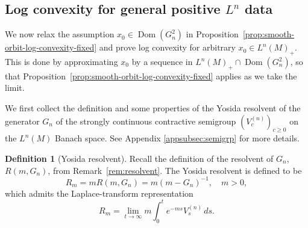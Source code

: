 \documentclass[11pt,a4paper]{article}
\theoremstyle{plain}
\numberwithin{theorem}{section}
\theoremstyle{definition}
\newtheorem{definition}[theorem]{Definition}
\newcommand{\?}{\overset{?}{=}}
\newcommand{\I}{\infty}
\DeclareMathOperator{\Dom}{Dom}
\begin{document}
\subsection{Log convexity for general positive \texorpdfstring{$L^n$}{Ln} data}
\label{subsec:integer-renyi-qnec-final-fixed}

We now relax the assumption $x_0\in \Dom(G_n^2)$ in Proposition~\ref{prop:smooth-orbit-log-convexity-fixed} and prove log convexity for arbitrary $x_0\in L^n(M)_+$. This is done by approximating $x_0$ by a sequence in $L^n(M)_+\cap\Dom(G_n^2)$, so that Proposition~\ref{prop:smooth-orbit-log-convexity-fixed} applies as we take the limit.

We first collect the definition and some properties of the Yosida resolvent of the generator $G_n$ of the strongly continuous contractive semigroup $(V_c^{(n)})_{c\geq0}$ on the $L^n(M)$ Banach space. See Appendix \ref{appsubsec:semigrp} for more details.
\begin{definition}[Yosida resolvent]\label{def:yosidaresolvent-main}
    Recall the definition of the resolvent of $G_n$, $R(m,G_n)$, from Remark~\ref{rem:resolvent}. The Yosida resolvent is defined to be
\begin{equation}
    R_m=mR(m,G_n)=m(m-G_n)^{-1}, \quad m>0,
\end{equation}
which admits the Laplace-transform representation
\begin{equation}
    R_m= \lim_{t\to\I} m\int_0^t e^{-m s}V_s^{(n)}\,ds.
\end{equation}
\end{definition}
\end{document}

